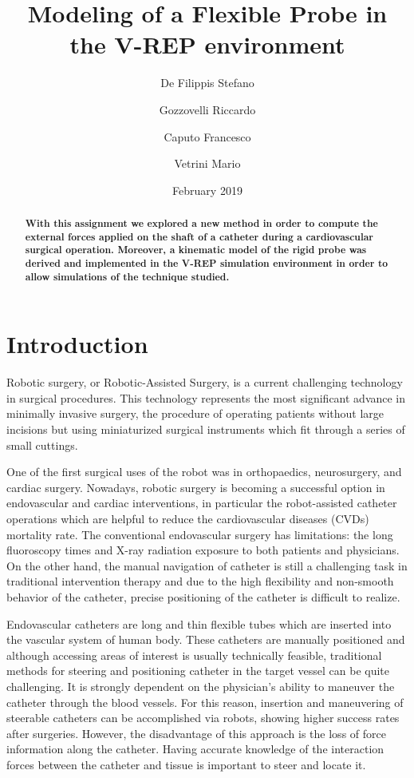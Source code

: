 \documentclass[conference,12pt]{IEEEtran}
\begin{document}
\title{\textbf{Modeling of a Flexible Probe in the V-REP environment}}
\author{De Filippis Stefano \and Gozzovelli Riccardo \and Caputo Francesco \and Vetrini Mario}
\date{February 2019}

\maketitle

\begin{abstract}
\textbf{With this assignment we explored a new method in order to compute the external forces applied on the shaft of a catheter during a cardiovascular surgical operation. Moreover, a kinematic model of the rigid probe was derived and implemented in the V-REP simulation environment in order to allow simulations of the technique studied.}
\end{abstract}

\section*{Introduction}

Robotic surgery, or Robotic-Assisted Surgery, is a current challenging technology in surgical procedures. This technology represents the most significant advance in minimally invasive surgery, the procedure of operating patients without large incisions but using miniaturized surgical instruments which fit through a series of small cuttings.

One of the first surgical uses of the robot was in orthopaedics, neurosurgery, and cardiac surgery. Nowadays, robotic surgery is becoming a successful option in endovascular and cardiac interventions, in particular the robot-assisted catheter operations which are helpful to reduce the cardiovascular diseases (CVDs) mortality rate. The conventional endovascular surgery has limitations: the long fluoroscopy times and X-ray radiation exposure to both patients and physicians. On the other hand, the manual navigation of catheter is still a challenging task in traditional intervention therapy and due to the high flexibility and non-smooth behavior of the catheter, precise positioning of the catheter is difficult to realize.

Endovascular catheters are long and thin flexible tubes which are inserted into the vascular system of human body. These catheters are manually positioned and although accessing areas of interest is usually technically feasible, traditional methods for steering and positioning catheter in the target vessel can be quite challenging. It is strongly dependent on the physician’s ability to maneuver the catheter through the blood vessels. For this reason, insertion and maneuvering of steerable catheters can be accomplished via robots, showing higher success rates after surgeries. However, the disadvantage of this approach is the loss of force information along the catheter. Having accurate knowledge of the interaction forces between the catheter and tissue is important to steer and locate it.
\end{document}
